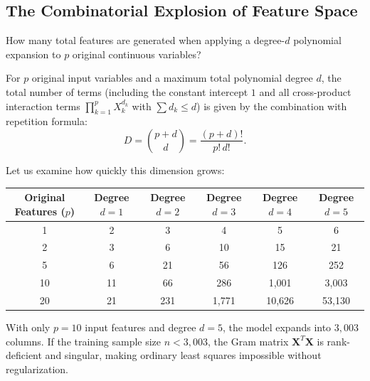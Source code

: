 \documentclass[11pt,a4paper]{article}
\numberwithin{equation}{section}
\newcommand{\X}{\mathbf{X}}
\begin{document}
\subsection{The Combinatorial Explosion of Feature Space}
How many total features are generated when applying a degree-$d$ polynomial expansion to $p$ original continuous variables?

\begin{keyidea}[title=Feature Dimension Formula]
For $p$ original input variables and a maximum total polynomial degree $d$, the total number of terms (including the constant intercept $1$ and all cross-product interaction terms $\prod_{k=1}^p X_k^{d_k}$ with $\sum d_k \leq d$) is given by the combination with repetition formula:
\begin{equation}
  D = \binom{p + d}{d} = \frac{(p + d)!}{p! \, d!}.
  \label{eq:poly_count}
\end{equation}
\end{keyidea}

Let us examine how quickly this dimension grows:
\begin{center}
\small
\setlength{\tabcolsep}{6pt}
\begin{tabular}{cccccc}
\toprule
Original Features ($p$) & Degree $d=1$ & Degree $d=2$ & Degree $d=3$ & Degree $d=4$ & Degree $d=5$ \\
\midrule
1  & 2   & 3    & 4     & 5     & 6 \\
2  & 3   & 6    & 10    & 15    & 21 \\
5  & 6   & 21   & 56    & 126   & 252 \\
10 & 11  & 66   & 286   & 1,001 & 3,003 \\
20 & 21  & 231  & 1,771 & 10,626& 53,130 \\
\bottomrule
\end{tabular}
\end{center}

\begin{warningbox}[title=The Curse of Dimensionality in Polynomial Expansion]
With only $p=10$ input features and degree $d=5$, the model expands into $3{,}003$ columns. If the training sample size $n < 3{,}003$, the Gram matrix $\X^T\X$ is rank-deficient and singular, making ordinary least squares impossible without regularization.
\end{warningbox}
\end{document}
